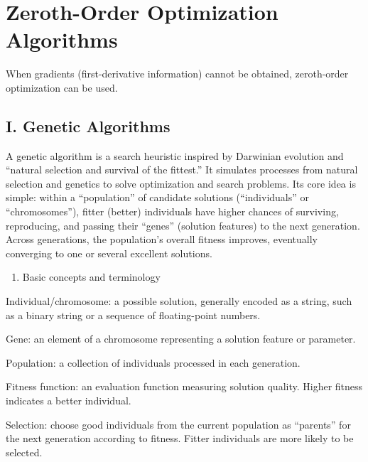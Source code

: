 \setcounter{section}{6}

\hypertarget{zeroth-order-optimization-algorithms}{%
\section{Zeroth-Order Optimization Algorithms}\label{zeroth-order-optimization-algorithms}}

When gradients (first-derivative information) cannot be obtained, zeroth-order optimization can be used.

\hypertarget{i.-genetic-algorithms}{%
\subsection{I. Genetic Algorithms}\label{i.-genetic-algorithms}}

A genetic algorithm is a search heuristic inspired by Darwinian evolution and ``natural selection and survival of the fittest.'' It simulates processes from natural selection and genetics to solve optimization and search problems. Its core idea is simple: within a ``population'' of candidate solutions (``individuals'' or ``chromosomes''), fitter (better) individuals have higher chances of surviving, reproducing, and passing their ``genes'' (solution features) to the next generation. Across generations, the population's overall fitness improves, eventually converging to one or several excellent solutions.

\begin{enumerate}
\def\labelenumi{\arabic{enumi}.}
\tightlist
\item
  Basic concepts and terminology
\end{enumerate}

Individual/chromosome: a possible solution, generally encoded as a string, such as a binary string or a sequence of floating-point numbers.

Gene: an element of a chromosome representing a solution feature or parameter.

Population: a collection of individuals processed in each generation.

Fitness function: an evaluation function measuring solution quality. Higher fitness indicates a better individual.

Selection: choose good individuals from the current population as ``parents'' for the next generation according to fitness. Fitter individuals are more likely to be selected.

